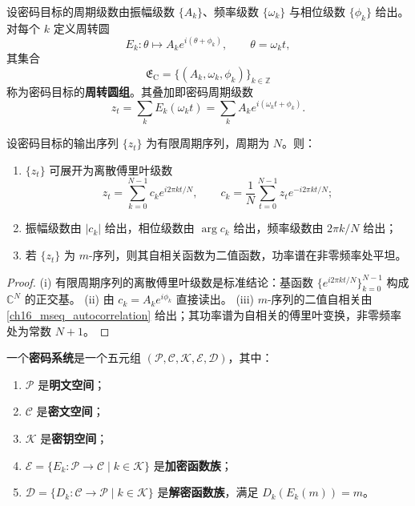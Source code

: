 \begin{definition}[密码周转圆组]\label{def:crypto_epicycle_group}
设密码目标的周期级数由振幅级数 \(\{A_k\}\)、频率级数 \(\{\omega_k\}\) 与相位级数 \(\{\phi_k\}\) 给出。对每个 \(k\) 定义周转圆
\[
E_k:\theta\mapsto A_k e^{i(\theta+\phi_k)},\qquad \theta=\omega_k t,
\]
其集合
\[
\mathfrak E_{\mathrm{C}}=\{(A_k,\omega_k,\phi_k)\}_{k\in\mathbb Z}
\]
称为密码目标的\textbf{周转圆组}。其叠加即密码周期级数
\[
z_t=\sum_k E_k(\omega_k t)=\sum_k A_k e^{i(\omega_k t+\phi_k)}.
\]
\end{definition}

\begin{theorem}[由密码数据构建周期级数]\label{thm:crypto_series_reconstruction}
设密码目标的输出序列 \(\{z_t\}\) 为有限周期序列，周期为 \(N\)。则：
\begin{enumerate}[label=(\roman*)]
    \item \(\{z_t\}\) 可展开为离散傅里叶级数
    \[
    z_t=\sum_{k=0}^{N-1}c_k e^{i2\pi kt/N},\qquad
    c_k=\frac1N\sum_{t=0}^{N-1}z_t e^{-i2\pi kt/N};
    \]
    \item 振幅级数由 \(|c_k|\) 给出，相位级数由 \(\arg c_k\) 给出，频率级数由 \(2\pi k/N\) 给出；
    \item 若 \(\{z_t\}\) 为 \(m\)-序列，则其自相关函数为二值函数，功率谱在非零频率处平坦。
\end{enumerate}
\end{theorem}

\begin{proof}
(i) 有限周期序列的离散傅里叶级数是标准结论：基函数 \(\{e^{i2\pi kt/N}\}_{k=0}^{N-1}\) 构成 \(\mathbb C^N\) 的正交基。
(ii) 由 \(c_k=A_k e^{i\phi_k}\) 直接读出。
(iii) \(m\)-序列的二值自相关由 \cref{ch16_mseq_autocorrelation} 给出；其功率谱为自相关的傅里叶变换，非零频率处为常数 \(N+1\)。
\end{proof}

\begin{definition}[密码系统五元组]\label{def:cryptosystem}
一个\textbf{密码系统}是一个五元组 \((\mathcal P,\mathcal C,\mathcal K,\mathcal E,\mathcal D)\)，其中：
\begin{enumerate}[label=(\roman*)]
    \item \(\mathcal P\) 是\textbf{明文空间}；
    \item \(\mathcal C\) 是\textbf{密文空间}；
    \item \(\mathcal K\) 是\textbf{密钥空间}；
    \item \(\mathcal E=\{E_k:\mathcal P\to\mathcal C\mid k\in\mathcal K\}\) 是\textbf{加密函数族}；
    \item \(\mathcal D=\{D_k:\mathcal C\to\mathcal P\mid k\in\mathcal K\}\) 是\textbf{解密函数族}，满足 \(D_k(E_k(m))=m\)。
\end{enumerate}
\end{definition}


